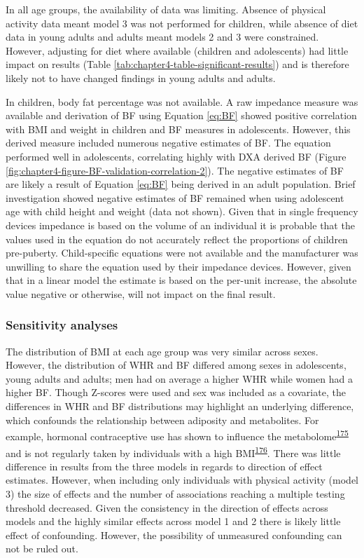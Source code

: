 \documentclass[11pt,twoside]{bristolthesis}
\begin{document}
In all age groups, the availability of data was limiting. Absence of physical activity data meant model 3 was not performed for children, while absence of diet data in young adults and adults meant models 2 and 3 were constrained. However, adjusting for diet where available (children and adolescents) had little impact on results (Table \ref{tab:chapter4-table-significant-results}) and is therefore likely not to have changed findings in young adults and adults.

In children, body fat percentage was not available. A raw impedance measure was available and derivation of BF using Equation \eqref{eq:BF} showed positive correlation with BMI and weight in children and BF measures in adolescents. However, this derived measure included numerous negative estimates of BF. The equation performed well in adolescents, correlating highly with DXA derived BF (Figure \ref{fig:chapter4-figure-BF-validation-correlation-2}). The negative estimates of BF are likely a result of Equation \eqref{eq:BF} being derived in an adult population. Brief investigation showed negative estimates of BF remained when using adolescent age with child height and weight (data not shown). Given that in single frequency devices impedance is based on the volume of an individual it is probable that the values used in the equation do not accurately reflect the proportions of children pre-puberty. Child-specific equations were not available and the manufacturer was unwilling to share the equation used by their impedance devices. However, given that in a linear model the estimate is based on the per-unit increase, the absolute value negative or otherwise, will not impact on the final result.

\hypertarget{sensitivity-analyses}{%
\subsubsection{Sensitivity analyses}\label{sensitivity-analyses}}

The distribution of BMI at each age group was very similar across sexes. However, the distribution of WHR and BF differed among sexes in adolescents, young adults and adults; men had on average a higher WHR while women had a higher BF. Though Z-scores were used and sex was included as a covariate, the differences in WHR and BF distributions may highlight an underlying difference, which confounds the relationship between adiposity and metabolites. For example, hormonal contraceptive use has shown to influence the metabolome\textsuperscript{\protect\hyperlink{ref-Rauschert2017}{175}} and is not regularly taken by individuals with a high BMI\textsuperscript{\protect\hyperlink{ref-Mody2014}{176}}. There was little difference in results from the three models in regards to direction of effect estimates. However, when including only individuals with physical activity (model 3) the size of effects and the number of associations reaching a multiple testing threshold decreased. Given the consistency in the direction of effects across models and the highly similar effects across model 1 and 2 there is likely little effect of confounding. However, the possibility of unmeasured confounding can not be ruled out.
\end{document}
